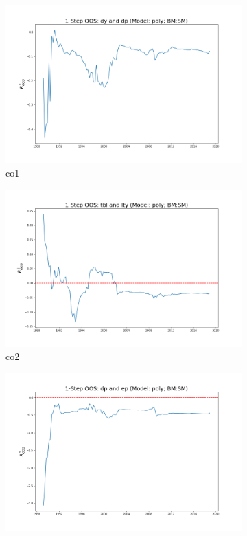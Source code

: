 \documentclass[a4paper,12pt,times,numbered,print,index]{report}
\numberwithin{equation}{section}
\begin{document}
\begin{figure}[!htbp]
	\centering
	\caption{OOS Results for Model with $f_7$}
	\begin{subfigure}[b]{0.42\linewidth}
		\includegraphics[width=0.9\linewidth]{OOS_plots/poly_co1_SM.png}
		\caption{co1}
	\end{subfigure}
	\begin{subfigure}[b]{0.42\linewidth}
		\includegraphics[width=0.9\linewidth]{OOS_plots/poly_co2_SM.png}
		\caption{co2}
	\end{subfigure}
	\begin{subfigure}[b]{0.42\linewidth}
		\includegraphics[width=0.9\linewidth]{OOS_plots/poly_co3_SM.png}

\end{subfigure}
\end{figure}
\end{document}
